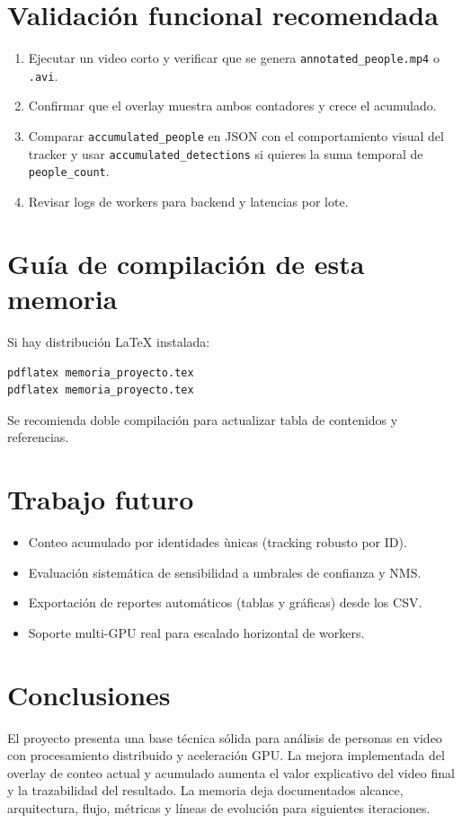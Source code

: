 \documentclass[11pt,a4paper]{article}
\begin{document}
\section{Validaci\'on funcional recomendada}
\begin{enumerate}[leftmargin=*]
  \item Ejecutar un video corto y verificar que se genera \texttt{annotated\_people.mp4} o \texttt{.avi}.
  \item Confirmar que el overlay muestra ambos contadores y crece el acumulado.
  \item Comparar \texttt{accumulated\_people} en JSON con el comportamiento visual del tracker y usar \texttt{accumulated\_detections} si quieres la suma temporal de \texttt{people\_count}.
  \item Revisar logs de workers para backend y latencias por lote.
\end{enumerate}

\section{Gu\'ia de compilaci\'on de esta memoria}
Si hay distribuci\'on LaTeX instalada:
\begin{lstlisting}[language=bash]
pdflatex memoria_proyecto.tex
pdflatex memoria_proyecto.tex
\end{lstlisting}

Se recomienda doble compilaci\'on para actualizar tabla de contenidos y referencias.

\section{Trabajo futuro}
\begin{itemize}[leftmargin=*]
  \item Conteo acumulado por identidades \`unicas (tracking robusto por ID).
  \item Evaluaci\'on sistem\'atica de sensibilidad a umbrales de confianza y NMS.
  \item Exportaci\'on de reportes autom\'aticos (tablas y gr\'aficas) desde los CSV.
  \item Soporte multi-GPU real para escalado horizontal de workers.
\end{itemize}

\section{Conclusiones}
El proyecto presenta una base t\'ecnica s\'olida para an\'alisis de personas en video con procesamiento distribuido y aceleraci\'on GPU. La mejora implementada del overlay de conteo actual y acumulado aumenta el valor explicativo del video final y la trazabilidad del resultado. La memoria deja documentados alcance, arquitectura, flujo, m\'etricas y l\'ineas de evoluci\'on para siguientes iteraciones.
\end{document}
